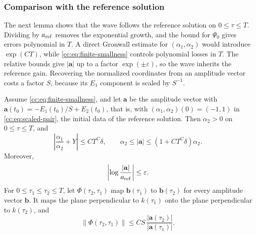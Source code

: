 \subsubsection{Comparison with the reference solution}
The next lemma shows that the wave follows the reference solution on
$0\le\tau\le T$. Dividing by $a_{\rm ref}$ removes the exponential
growth, and the bound for $\Psi_0$ gives errors polynomial in $T$.
A direct Gronwall estimate for $(\alpha_1,\alpha_2)$ would introduce
$\exp(CT)$, while \eqref{cc:eq:finite-smallness} controls polynomial
losses in $T$. The relative bounds give $|\mathbf a|$ up to a factor
$\exp(\pm\varepsilon)$, so the wave inherits the reference gain.
Recovering the normalized coordinates from an amplitude vector costs
a factor $S$, because its $E_1$ component is scaled by $S^{-1}$.

\begin{lemma}\label{cc:lem:finite-comparison}
Assume \eqref{cc:eq:finite-smallness}, and let $\mathbf a$ be the
amplitude vector with $\mathbf a(t_0)=-E_1(t_0)/S+E_2(t_0)$, that is,
with $(\alpha_1,\alpha_2)(0)=(-1,1)$ in \eqref{cc:eq:scaled-pair}, the
initial data of the reference solution.
Then $\alpha_2>0$ on $0\le\tau\le T$, and
\begin{equation}\label{cc:eq:amplitude-comparison}
 \left|\frac{\alpha_1}{\alpha_2}+Y\right|\le CT^C\delta,\qquad
 \alpha_2\le|\mathbf a|\le(1+CT^C\delta)\alpha_2.
\end{equation}
Moreover,
\begin{equation}\label{cc:eq:norm-rate-error}
 \left|\log\frac{|\mathbf a|}{a_{\rm ref}}\right|\le\varepsilon.
\end{equation}
For $0\le\tau_1\le\tau_2\le T$, let $\Phi(\tau_2,\tau_1)$ map
$\mathbf b(\tau_1)$ to $\mathbf b(\tau_2)$ for every amplitude vector
$\mathbf b$. It maps the plane perpendicular to $k(\tau_1)$ onto the
plane perpendicular to $k(\tau_2)$, and
\[
 \|\Phi(\tau_2,\tau_1)\|
 \le CS\,\frac{|\mathbf a(\tau_2)|}{|\mathbf a(\tau_1)|}.
\]
\end{lemma}
